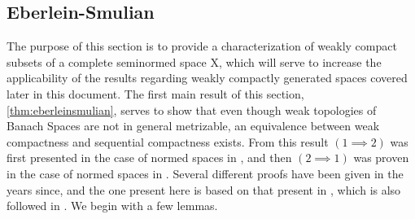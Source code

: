 \subsection{Eberlein-Smulian}
The purpose of this section is to provide a characterization of weakly compact subsets of a complete seminormed space X, which will serve to increase the applicability of the results regarding weakly compactly generated spaces covered later in this document. 
The first main result of this section, \ref{thm:eberleinsmulian}, serves to show that even though weak topologies of Banach Spaces are not in general metrizable, an equivalence between weak compactness and sequential compactness exists. From this  result $(1 \implies 2)$ was first presented in the case of normed spaces in \cite{smulian40}, and then $(2 \implies 1)$ was proven in the case of normed spaces in \cite{eberlein47}. Several different proofs have been given in the years since, and the one present here is based on that present in \cite{whitley67}, which is also followed in \cite{diestel84}. 
We begin with a few lemmas. 
